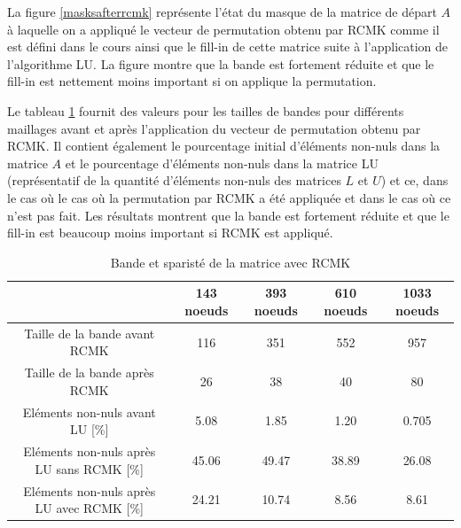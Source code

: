 \documentclass[11pt]{article}
\begin{document}
La figure \ref{masksafterrcmk} représente l'état du masque de la matrice de départ $A$ à laquelle on a appliqué le vecteur de permutation obtenu par RCMK comme il est défini dans le cours ainsi que le fill-in de cette matrice suite à l'application de l'algorithme LU. La figure montre que la bande est fortement réduite et que le fill-in est nettement moins important si on applique la permutation.\\
\vspace{-8pt}

Le tableau \ref{tablercmk} fournit des valeurs pour les tailles de bandes pour différents maillages avant et après l'application du vecteur de permutation obtenu par RCMK. Il contient également le pourcentage initial d'éléments non-nuls dans la matrice $A$ et le pourcentage d'éléments non-nuls dans la matrice LU (représentatif de la quantité d'éléments non-nuls des matrices $L$ et $U$) et ce, dans le cas où le cas où la permutation par RCMK a été appliquée et dans le cas où ce n'est pas fait. Les résultats montrent que la bande est fortement réduite et que le fill-in est beaucoup moins important si RCMK est appliqué.\\ 

\begin{table}[]
    \centering
    \begin{tabular}{|c|c|c|c|c|}
        \hline
         & 143 noeuds & 393 noeuds & 610 noeuds & 1033 noeuds\\
        \hline
         Taille de la bande avant RCMK & 116 & 351 & 552 & 957 \\
        \hline
         Taille de la bande après RCMK & 26 & 38 & 40 & 80 \\
        \hline
         Eléments non-nuls avant LU [\%] & 5.08 & 1.85 & 1.20 &  0.705 \\
        \hline
         Eléments non-nuls après LU sans RCMK [\%] & 45.06 & 49.47 & 38.89 &  26.08 \\
        \hline
         Eléments non-nuls après LU avec RCMK [\%] & 24.21 & 10.74 & 8.56 & 8.61 \\
        \hline
    \end{tabular}
    \caption{Bande et sparisté de la matrice avec RCMK}
    \label{tablercmk}
\end{table}
\vspace{-8pt}
\end{document}

